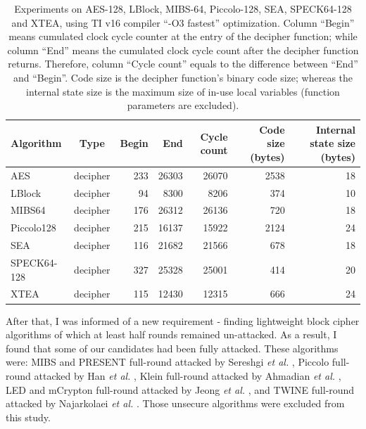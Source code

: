 \documentclass[sigconf, review=false]{acmart}
\begin{document}
\begin{table}[tbp]
\centering
\caption{Experiments on AES-128, LBlock, MIBS-64, Piccolo-128, SEA, SPECK64-128 and XTEA,
using TI v16 compiler ``-O3 fastest'' optimization.
Column ``Begin'' means cumulated clock cycle counter at the entry of the decipher function;
while column ``End'' means the cumulated clock cycle count after the decipher function returns.
Therefore, column ``Cycle count'' equals to the difference between ``End'' and ``Begin''.
Code size is the decipher function's binary code size;
whereas the internal state size is the maximum size of in-use local variables (function parameters are excluded).}
\label{tab-beg}
\begin{tabular}{lcrrrrr}
    \toprule
Algorithm   & Type     & Begin & End   & Cycle count & Code size (bytes) & Internal state size (bytes) \\
    \midrule
AES         & decipher & 233   & 26303 & 26070       & 2538              & 18                          \\
LBlock      & decipher & 94    & 8300  & 8206        & 374               & 10                          \\
MIBS64      & decipher & 176   & 26312 & 26136       & 720               & 18                          \\
Piccolo128  & decipher & 215   & 16137 & 15922       & 2124              & 24                          \\
SEA         & decipher & 116   & 21682 & 21566       & 678               & 18                          \\
SPECK64-128 & decipher & 327   & 25328 & 25001       & 414               & 20                          \\
XTEA        & decipher & 115   & 12430 & 12315       & 666               & 24                          \\
    \bottomrule
\end{tabular}
\end{table}

After that, I was informed of a new requirement - finding lightweight block cipher algorithms of which at least half rounds remained un-attacked.
As a result, I found that some of our candidates had been fully attacked.
These algorithms were: MIBS and PRESENT \cite{bogdanov2007present} full-round attacked by Sereshgi \textit{et al.} \cite{sereshgi2016biclique},
Piccolo full-round attacked by Han \textit{et al.} \cite{han2017improved}, Klein \cite{gong2011klein} full-round attacked by Ahmadian \textit{et al.} \cite{ahmadian2015biclique},
LED \cite{Guo:2011:LBC:2044928.2044958} and mCrypton \cite{lim2005mcrypton} full-round attacked by Jeong \textit{et al.} \cite{jeong2015weakness},
and TWINE \cite{suzaki2012twine} full-round attacked by Najarkolaei \textit{et al.} \cite{najarkolaei2016biclique}.
Those unsecure algorithms were excluded from this study.
\end{document}
